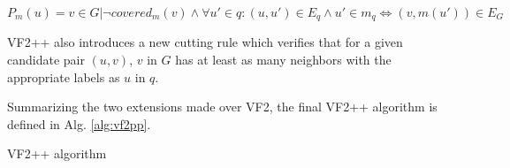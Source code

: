 \[ P_m(u) = {v \in G | \neg covered_m(v) \land \forall u' \in q: (u, u') \in E_q \land u' \in m_q \iff (v, m(u')) \in E_G}  \]

VF2++ also introduces a new cutting rule which verifies that for a given candidate pair $(u, v)$,
$v$ in $G$ has at least as many neighbors with the appropriate labels as $u$ in $q$. 

Summarizing the two extensions made over VF2, the final VF2++ algorithm is defined in Alg. \ref{alg:vf2pp}.

\begin{algorithm}[h!]
    \SetAlgoLined\DontPrintSemicolon
    \label{alg:vf2pp}
    \caption{VF2++ algorithm}
\end{algorithm}


